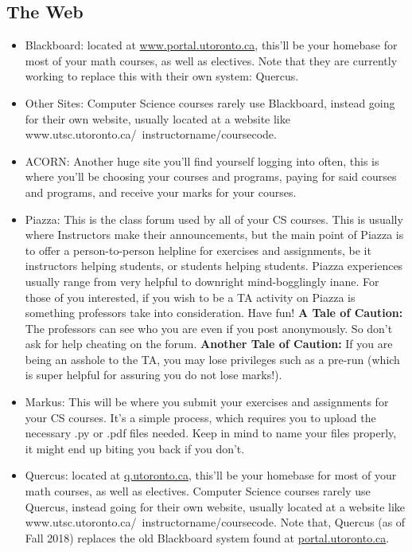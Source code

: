 \documentclass[11pt]{article}
\begin{document}
\subsection{The Web}
\begin{itemize}
\item Blackboard: located at \url{www.portal.utoronto.ca}, this'll be your homebase for most of your math courses, as well as electives. Note that they are currently working to replace this with their own system: Quercus.
\item Other Sites: Computer Science courses rarely use Blackboard, instead going for their own website, usually located at a website like www.utsc.utoronto.ca/~instructorname/coursecode.
\item ACORN: Another huge site you'll find yourself logging into often, this is where you'll be choosing your courses and programs, paying for said courses and programs, and receive your marks for your courses.
\item Piazza: This is the class forum used by all of your CS courses. This is usually where Instructors make their announcements, but the main point of Piazza is to offer a person-to-person helpline for exercises and assignments, be it instructors helping students, or students helping students. Piazza experiences usually range from very helpful to downright mind-bogglingly inane. For those of you interested, if you wish to be a TA activity on Piazza is something professors take into consideration. Have fun! \textbf{A Tale of Caution:} The professors can see who you are even if you post anonymously. So don't ask for help cheating on the forum. \textbf{Another Tale of Caution:} If you are being an asshole to the TA, you may lose privileges such as a pre-run (which is super helpful for assuring you do not lose marks!).
\item Markus: This will be where you submit your exercises and assignments for your CS courses. It's a simple process, which requires you to upload the necessary .py or .pdf files needed. Keep in mind to name your files properly, it might end up biting you back if you don't.
 
\item Quercus: located at \url{q.utoronto.ca}, this'll be your homebase for most of your math courses, as well as electives.  Computer Science courses rarely use Quercus, instead going for their own website, usually located at a website like www.utsc.utoronto.ca/~instructorname/coursecode. Note that, Quercus (as of Fall 2018) replaces the old Blackboard system found at \url{portal.utoronto.ca}.
\end{itemize}
\end{document}
